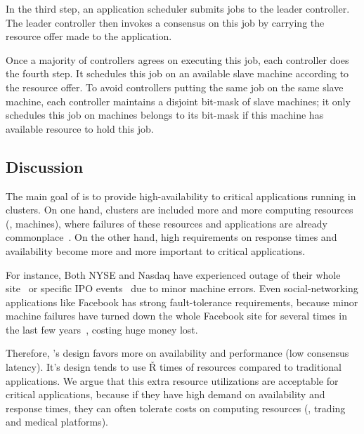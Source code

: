 In the third step, an application scheduler submits jobs to the leader 
controller. The leader controller then invokes a consensus on this job by 
carrying the resource offer made to the application.

Once a majority of controllers agrees on executing this job, each controller 
does the fourth step. It schedules this job on an available slave machine 
according to the resource offer. To avoid controllers putting the same job on 
the same slave machine, each controller maintains a disjoint bit-mask of slave 
machines; it only schedules this job on machines belongs to its bit-mask if 
this machine has available resource to hold this job.


\subsection{Discussion} \label{sec:discuss}

The main goal of \xxx is to provide high-availability to critical applications 
running in clusters. On one hand, clusters are included more and more computing 
resources (\eg, machines), where failures of these resources and applications 
are already commonplace~\cite{facebook:outage}. On the other hand, 
high requirements on response times and availability become more and more 
important to critical applications.

For instance, Both NYSE and Nasdaq have experienced outage of their whole 
site~\cite{nyse:halt} or specific IPO events~\cite{facebook:ipo:delay} due to 
minor machine errors.  Even social-networking applications like Facebook has 
strong fault-tolerance requirements, because minor machine failures have turned 
down the whole Facebook site for several times in the last few 
years~\cite{facebook:outage}, costing huge 
money lost. 

Therefore, \xxx's design favors more on availability and performance 
(low consensus latency). It's design tends to use \v{R} times of resources 
compared to traditional applications. We argue that this extra resource 
utilizations are acceptable for critical applications, because if they have high 
demand on availability and response times, they can often tolerate costs on 
computing resources (\eg, trading and medical platforms).


